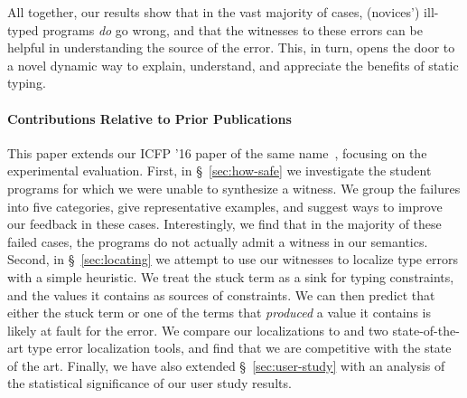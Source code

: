 %
%
%
%
%
%

\smallskip
All together, our results show that in the vast majority of cases, (novices') ill-typed
programs \emph{do} go wrong, and that the witnesses to these errors can be
helpful in understanding the source of the error. This, in turn, opens the
door to a novel dynamic way to explain, understand, and appreciate the
benefits of static typing.

\paragraph{Contributions Relative to Prior Publications}
This paper extends our ICFP '16 paper of the same
name~\cite{Seidel2016-ul}, focusing on the experimental evaluation.
%
First, in \S~\ref{sec:how-safe} we investigate the student programs for
which we were unable to synthesize a witness. We group the failures into
five categories, give representative examples, and suggest ways to
improve our feedback in these cases. Interestingly, we find that in the
majority of these failed cases, the programs do not actually admit a
witness in our semantics.
%
Second, in \S~\ref{sec:locating} we attempt to use our witnesses to
localize type errors with a simple heuristic. We treat the stuck term as
a sink for typing constraints, and the values it contains as sources of
constraints. We can then predict that either the stuck term or one of
the terms that \emph{produced} a value it contains is likely at fault
for the error. We compare our localizations to \ocaml and two
state-of-the-art type error localization tools, and find that we are
competitive with the state of the art.
%
Finally, we have also extended \S~\ref{sec:user-study} with an analysis
of the statistical significance of our user study results.

